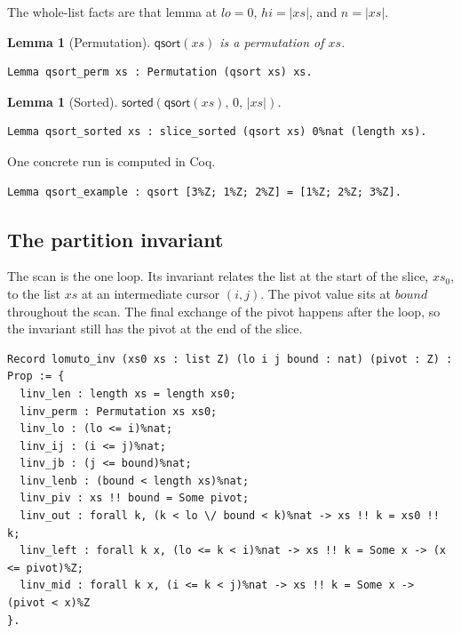 \documentclass[11pt]{article}
\newtheorem{lemma}[theorem]{Lemma}
\begin{document}
The whole-list facts are that lemma at \(lo = 0\), \(hi = \lvert xs \rvert\), and \(n = \lvert xs \rvert\).

\begin{lemma}[Permutation]
\(\mathsf{qsort}(xs)\) is a permutation of \(xs\).
\end{lemma}

\begin{lstlisting}
Lemma qsort_perm xs : Permutation (qsort xs) xs.
\end{lstlisting}

\begin{lemma}[Sorted]
\(\mathsf{sorted}(\mathsf{qsort}(xs),\, 0,\, \lvert xs \rvert)\).
\end{lemma}

\begin{lstlisting}
Lemma qsort_sorted xs : slice_sorted (qsort xs) 0%nat (length xs).
\end{lstlisting}

One concrete run is computed in Coq.

\begin{lstlisting}
Lemma qsort_example : qsort [3%Z; 1%Z; 2%Z] = [1%Z; 2%Z; 3%Z].
\end{lstlisting}

\subsection{The partition invariant}

The scan is the one loop.
Its invariant relates the list at the start of the slice, \(xs_0\), to the list \(xs\) at an intermediate cursor \((i, j)\).
The pivot value sits at \(\mathit{bound}\) throughout the scan.
The final exchange of the pivot happens after the loop, so the invariant still has the pivot at the end of the slice.

\begin{lstlisting}
Record lomuto_inv (xs0 xs : list Z) (lo i j bound : nat) (pivot : Z) : Prop := {
  linv_len : length xs = length xs0;
  linv_perm : Permutation xs xs0;
  linv_lo : (lo <= i)%nat;
  linv_ij : (i <= j)%nat;
  linv_jb : (j <= bound)%nat;
  linv_lenb : (bound < length xs)%nat;
  linv_piv : xs !! bound = Some pivot;
  linv_out : forall k, (k < lo \/ bound < k)%nat -> xs !! k = xs0 !! k;
  linv_left : forall k x, (lo <= k < i)%nat -> xs !! k = Some x -> (x <= pivot)%Z;
  linv_mid : forall k x, (i <= k < j)%nat -> xs !! k = Some x -> (pivot < x)%Z
}.
\end{lstlisting}
\end{document}
